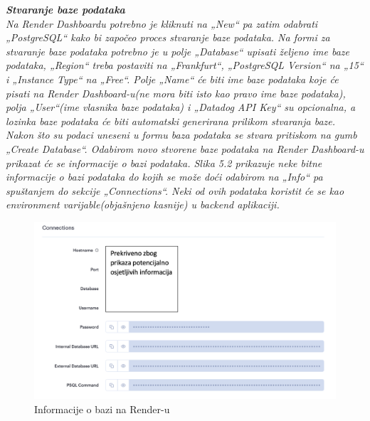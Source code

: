 		\textbf{\textit{Stvaranje baze podataka}}\\
			\textit{Na Render Dashboardu potrebno je kliknuti na „New“ pa zatim odabrati „PostgreSQL“ kako bi započeo proces stvaranje baze podataka. Na formi za stvaranje baze podataka potrebno je u polje „Database“ upisati željeno ime baze podataka, „Region“ treba postaviti na „Frankfurt“, „PostgreSQL Version“ na „15“ i „Instance Type“ na „Free“. Polje „Name“ će biti ime baze podataka koje će pisati na Render Dashboard-u(ne mora biti isto kao pravo ime baze podataka), polja „User“(ime vlasnika baze podataka) i „Datadog API Key“ su opcionalna, a lozinka baze podataka će biti automatski generirana prilikom stvaranja baze. Nakon što su podaci uneseni u formu baza podataka se stvara pritiskom na gumb „Create Database“. Odabirom novo stvorene baze podataka na Render Dashboard-u prikazat će se informacije o bazi podataka. Slika 5.2 prikazuje neke bitne informacije o bazi podataka do kojih se može doći odabirom na „Info“ pa spuštanjem do sekcije „Connections“. Neki od ovih podataka koristit će se kao environment varijable(objašnjeno kasnije) u backend aplikaciji.}
		\bigskip
	
		\begin{figure}[H]
		\centering
		\includegraphics[width=\textwidth]{slike/deployment/slika1.png}
		\caption{Informacije o bazi na Render-u}
		\label{fig:my_label}
    	\end{figure}
    
    \bigskip
    
